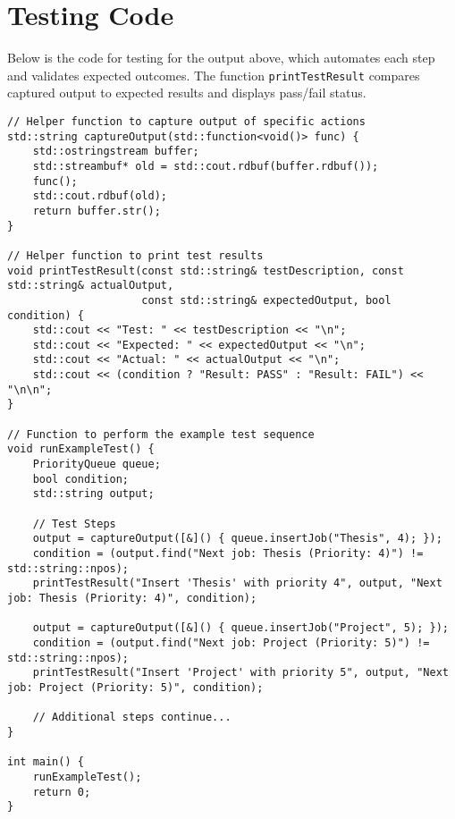 \documentclass{article}
\begin{document}
\section{Testing Code}
Below is the code for testing for the output above, which automates each step and validates expected outcomes. The function \texttt{printTestResult} compares captured output to expected results and displays pass/fail status.

\begin{lstlisting}
// Helper function to capture output of specific actions
std::string captureOutput(std::function<void()> func) {
    std::ostringstream buffer;
    std::streambuf* old = std::cout.rdbuf(buffer.rdbuf());
    func();
    std::cout.rdbuf(old);
    return buffer.str();
}

// Helper function to print test results
void printTestResult(const std::string& testDescription, const std::string& actualOutput,
                     const std::string& expectedOutput, bool condition) {
    std::cout << "Test: " << testDescription << "\n";
    std::cout << "Expected: " << expectedOutput << "\n";
    std::cout << "Actual: " << actualOutput << "\n";
    std::cout << (condition ? "Result: PASS" : "Result: FAIL") << "\n\n";
}

// Function to perform the example test sequence
void runExampleTest() {
    PriorityQueue queue;
    bool condition;
    std::string output;

    // Test Steps
    output = captureOutput([&]() { queue.insertJob("Thesis", 4); });
    condition = (output.find("Next job: Thesis (Priority: 4)") != std::string::npos);
    printTestResult("Insert 'Thesis' with priority 4", output, "Next job: Thesis (Priority: 4)", condition);

    output = captureOutput([&]() { queue.insertJob("Project", 5); });
    condition = (output.find("Next job: Project (Priority: 5)") != std::string::npos);
    printTestResult("Insert 'Project' with priority 5", output, "Next job: Project (Priority: 5)", condition);

    // Additional steps continue...
}

int main() {
    runExampleTest();
    return 0;
}
\end{lstlisting}
\end{document}
